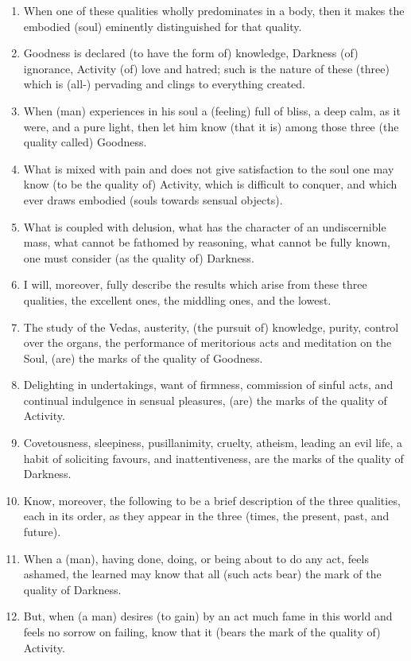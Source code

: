 \begin{enumerate}
\item When one of these qualities wholly predominates in a body, then it makes the embodied (soul) eminently distinguished for that quality.
\item Goodness is declared (to have the form of) knowledge, Darkness (of) ignorance, Activity (of) love and hatred; such is the nature of these (three) which is (all-) pervading and clings to everything created.
\item When (man) experiences in his soul a (feeling) full of bliss, a deep calm, as it were, and a pure light, then let him know (that it is) among those three (the quality called) Goodness.
\item What is mixed with pain and does not give satisfaction to the soul one may know (to be the quality of) Activity, which is difficult to conquer, and which ever draws embodied (souls towards sensual objects).
\item What is coupled with delusion, what has the character of an undiscernible mass, what cannot be fathomed by reasoning, what cannot be fully known, one must consider (as the quality of) Darkness.
\item I will, moreover, fully describe the results which arise from these three qualities, the excellent ones, the middling ones, and the lowest.
\item The study of the Vedas, austerity, (the pursuit of) knowledge, purity, control over the organs, the performance of meritorious acts and meditation on the Soul, (are) the marks of the quality of Goodness.
\item Delighting in undertakings, want of firmness, commission of sinful acts, and continual indulgence in sensual pleasures, (are) the marks of the quality of Activity.
\item Covetousness, sleepiness, pusillanimity, cruelty, atheism, leading an evil life, a habit of soliciting favours, and inattentiveness, are the marks of the quality of Darkness.
\item Know, moreover, the following to be a brief description of the three qualities, each in its order, as they appear in the three (times, the present, past, and future).
\item When a (man), having done, doing, or being about to do any act, feels ashamed, the learned may know that all (such acts bear) the mark of the quality of Darkness.
\item But, when (a man) desires (to gain) by an act much fame in this world and feels no sorrow on failing, know that it (bears the mark of the quality of) Activity.

\end{enumerate}
